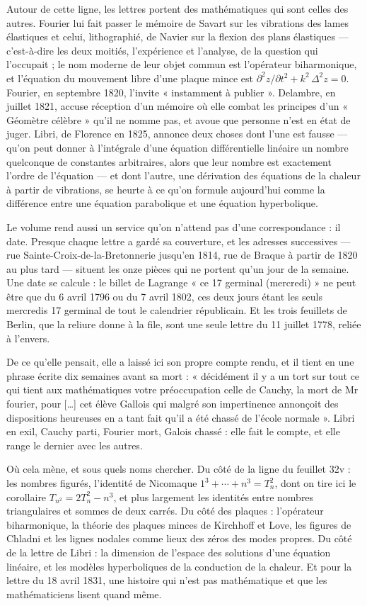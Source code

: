 \documentclass[11pt,a4paper]{article}
\begin{document}
\begin{resume}
Autour de cette ligne, les lettres portent des mathématiques qui sont celles
des autres. Fourier lui fait passer le mémoire de Savart sur les vibrations
des lames élastiques et celui, lithographié, de Navier sur la flexion des
plans élastiques — c'est-à-dire les deux moitiés, l'expérience et l'analyse,
de la question qui l'occupait ; le nom moderne de leur objet commun est
l'opérateur biharmonique, et l'équation du mouvement libre d'une plaque mince
est $\partial^2 z/\partial t^2 + k^2\,\Delta^2 z = 0$. Fourier, en septembre
1820, l'invite « instamment à publier ». Delambre, en juillet 1821, accuse
réception d'un mémoire où elle combat les principes d'un « Géomètre célèbre »
qu'il ne nomme pas, et avoue que personne n'est en état de juger. Libri, de
Florence en 1825, annonce deux choses dont l'une est fausse — qu'on peut
donner à l'intégrale d'une équation différentielle linéaire un nombre
quelconque de constantes arbitraires, alors que leur nombre est exactement
l'ordre de l'équation — et dont l'autre, une dérivation des équations de la
chaleur à partir de vibrations, se heurte à ce qu'on formule aujourd'hui comme
la différence entre une équation parabolique et une équation hyperbolique.

Le volume rend aussi un service qu'on n'attend pas d'une correspondance : il
date. Presque chaque lettre a gardé sa couverture, et les adresses successives
— rue Sainte-Croix-de-la-Bretonnerie jusqu'en 1814, rue de Braque à partir de
1820 au plus tard — situent les onze pièces qui ne portent qu'un jour de la
semaine. Une date se calcule : le billet de Lagrange « ce 17 germinal
(mercredi) » ne peut être que du 6 avril 1796 ou du 7 avril 1802, ces deux
jours étant les seuls mercredis 17 germinal de tout le calendrier
républicain. Et les trois feuillets de Berlin, que la reliure donne à la
file, sont une seule lettre du 11 juillet 1778, reliée à l'envers.

De ce qu'elle pensait, elle a laissé ici son propre compte rendu, et il tient
en une phrase écrite dix semaines avant sa mort : « décidément il y a un tort
sur tout ce qui tient aux mathématiques votre préoccupation celle de Cauchy,
la mort de Mr fourier, pour […] cet élève Gallois qui malgré son impertinence
annonçoit des dispositions heureuses en a tant fait qu'il a été chassé de
l'école normale ». Libri en exil, Cauchy parti, Fourier mort, Galois chassé :
elle fait le compte, et elle range le dernier avec les autres.

Où cela mène, et sous quels noms chercher. Du côté de la ligne du feuillet
32v : les nombres figurés, l'identité de Nicomaque $1^3+\cdots+n^3 = T_n^2$,
dont on tire ici le corollaire $T_{n^2} = 2T_n^2 - n^3$, et plus largement les
identités entre nombres triangulaires et sommes de deux carrés. Du côté des
plaques : l'opérateur biharmonique, la théorie des plaques minces de
Kirchhoff et Love, les figures de Chladni et les lignes nodales comme lieux
des zéros des modes propres. Du côté de la lettre de Libri : la dimension de
l'espace des solutions d'une équation linéaire, et les modèles hyperboliques
de la conduction de la chaleur. Et pour la lettre du 18 avril 1831, une
histoire qui n'est pas mathématique et que les mathématiciens lisent quand
même.


\end{resume}
\end{document}
